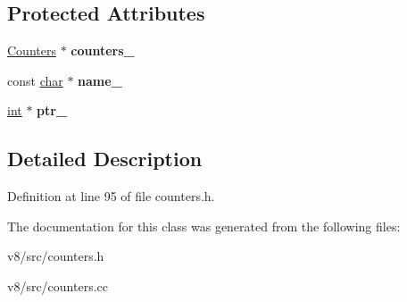 \subsection*{Protected Attributes}
\begin{DoxyCompactItemize}
\item 
\mbox{\label{classv8_1_1internal_1_1StatsCounterBase_a3dfff46795fa3976789a3e391519ecb4}} 
\mbox{\hyperlink{classv8_1_1internal_1_1Counters}{Counters}} $\ast$ {\bfseries counters\+\_\+}
\item 
\mbox{\label{classv8_1_1internal_1_1StatsCounterBase_a7c837c9fe6b39f28fbc07a56a23bb6c4}} 
const \mbox{\hyperlink{classchar}{char}} $\ast$ {\bfseries name\+\_\+}
\item 
\mbox{\label{classv8_1_1internal_1_1StatsCounterBase_a495b9636fa2562cb0c5101af2cfe5b38}} 
\mbox{\hyperlink{classint}{int}} $\ast$ {\bfseries ptr\+\_\+}
\end{DoxyCompactItemize}


\subsection{Detailed Description}


Definition at line 95 of file counters.\+h.



The documentation for this class was generated from the following files\+:\begin{DoxyCompactItemize}
\item 
v8/src/counters.\+h\item 
v8/src/counters.\+cc\end{DoxyCompactItemize}
